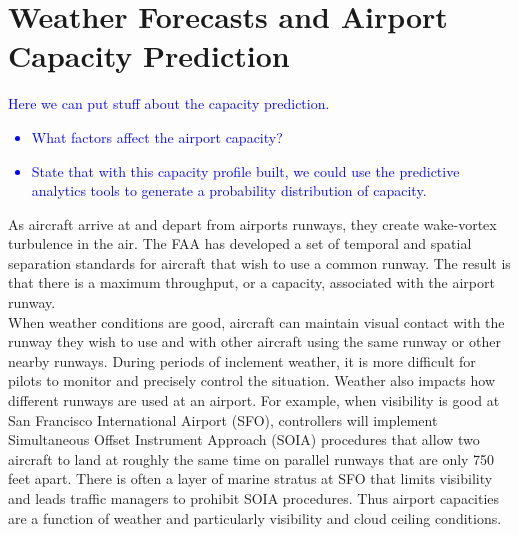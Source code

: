 \documentclass[12pt]{article}
\begin{document}
\section{Weather Forecasts and Airport Capacity Prediction}\label{Capacity}
	\textcolor{blue}{Here we can put stuff about the capacity prediction.
	\begin{itemize}
		\item What factors affect the airport capacity?
		\item State that with this capacity profile built, we could use the predictive analytics tools to generate a probability distribution of capacity.
	\end{itemize}
	}
	As aircraft arrive at and depart from airports runways, they create wake-vortex turbulence in the air.  The FAA has developed a set of temporal and spatial separation standards for aircraft that wish to use a common runway.  The result is that there is a maximum throughput, or a capacity, associated with the airport runway.\\
	\newline
	When weather conditions are good, aircraft can maintain visual contact with the runway they wish to use and with other aircraft using the same runway or other nearby runways.  During periods of inclement weather, it is more difficult for pilots to monitor and precisely control the situation.  Weather also impacts how different runways are used at an airport.  For example, when visibility is good at San Francisco International Airport (SFO), controllers will implement Simultaneous Offset Instrument Approach (SOIA) procedures that allow two aircraft to land at roughly the same time on parallel runways that are only 750 feet apart.  There is often a layer of marine stratus at SFO that limits visibility and leads traffic managers to prohibit SOIA procedures.  Thus airport capacities are a function of weather and particularly visibility and cloud ceiling conditions.
\end{document}
